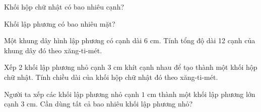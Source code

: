 \begin{ex} %
Khối hộp chữ nhật có bao nhiêu cạnh?
\end{ex}

\begin{ex} %
Khối lập phương có bao nhiêu mặt?
\end{ex}

\begin{ex} %
Một khung dây hình lập phương có cạnh dài $6\text{ cm}$. Tính tổng độ dài 12 cạnh của khung dây đó theo xăng-ti-mét.
\end{ex}

\begin{ex} %
Xếp 2 khối lập phương nhỏ cạnh $3\text{ cm}$ khít cạnh nhau để tạo thành một khối hộp chữ nhật. Tính chiều dài của khối hộp chữ nhật đó theo xăng-ti-mét.
\end{ex}

\begin{ex} %
Người ta xếp các khối lập phương nhỏ cạnh $1\text{ cm}$ thành một khối lập phương lớn cạnh $3\text{ cm}$. Cần dùng tất cả bao nhiêu khối lập phương nhỏ?
\end{ex}
